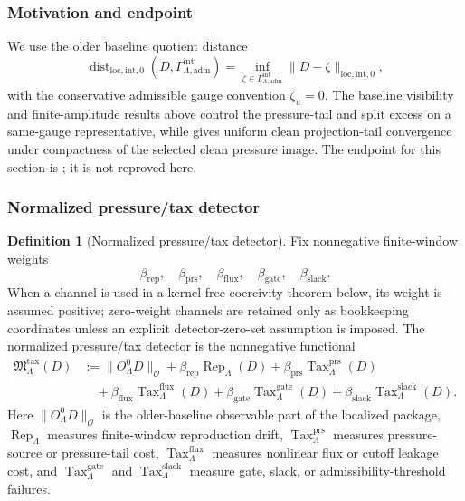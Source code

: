\documentclass[11pt]{article}
\numberwithin{equation}{section}
\theoremstyle{definition}
\newtheorem{definition}[definition]{Definition}
\theoremstyle{remark}
\newcommand{\loc}{\mathrm{loc}}
\newcommand{\intg}{\mathrm{int}}
\newcommand{\adm}{\mathrm{adm}}
\newcommand{\prs}{\mathrm{prs}}
\newcommand{\Dist}{\operatorname{dist}}
\newcommand{\Gammaadm}{\Gamma^{\intg}_{\Lambda,\adm}}
\begin{document}
\subsubsection{Motivation and endpoint}

We use the older baseline quotient distance
\[
    \Dist_{\loc,\intg,0}(D,\Gammaadm)
    =
    \inf_{\zeta\in\Gammaadm}
    \|D-\zeta\|_{\loc,\intg,0},
\]
with the conservative admissible gauge convention \(\zeta_u=0\).  The
baseline visibility and finite-amplitude results above control the
pressure-tail and split excess on a same-gauge representative, while
 gives uniform clean
projection-tail convergence under compactness of the selected clean pressure
image.  The endpoint for this section is
; it is not reproved here.

\subsubsection{Normalized pressure/tax detector}

\begin{definition}[Normalized pressure/tax detector]
\label{def:normalized-pressure-tax-detector}
Fix nonnegative finite-window weights
\[
    \beta_{\mathrm{rep}},\quad
    \beta_{\prs},\quad
    \beta_{\mathrm{flux}},\quad
    \beta_{\mathrm{gate}},\quad
    \beta_{\mathrm{slack}}.
\]
When a channel is used in a kernel-free coercivity theorem below, its weight
is assumed positive; zero-weight channels are retained only as bookkeeping
coordinates unless an explicit detector-zero-set assumption is imposed.
The normalized pressure/tax detector is the nonnegative functional
\[
\begin{aligned}
    \mathfrak M^{\mathrm{tax}}_\Lambda(D)
    &:=
    \|O^0_\Lambda D\|_{\mathcal O}
    +
    \beta_{\mathrm{rep}}\operatorname{Rep}_\Lambda(D)
    +
    \beta_{\prs}\operatorname{Tax}^{\prs}_\Lambda(D)
\\
    &\quad+
    \beta_{\mathrm{flux}}\operatorname{Tax}^{\mathrm{flux}}_\Lambda(D)
    +
    \beta_{\mathrm{gate}}\operatorname{Tax}^{\mathrm{gate}}_\Lambda(D)
    +
    \beta_{\mathrm{slack}}\operatorname{Tax}^{\mathrm{slack}}_\Lambda(D).
\end{aligned}
\]
Here \(\|O^0_\Lambda D\|_{\mathcal O}\) is the older-baseline observable
part of the localized package, \(\operatorname{Rep}_\Lambda\) measures
finite-window reproduction drift, \(\operatorname{Tax}^{\prs}_\Lambda\)
measures pressure-source or pressure-tail cost,
\(\operatorname{Tax}^{\mathrm{flux}}_\Lambda\) measures nonlinear flux or
cutoff leakage cost, and
\(\operatorname{Tax}^{\mathrm{gate}}_\Lambda\) and
\(\operatorname{Tax}^{\mathrm{slack}}_\Lambda\) measure gate, slack, or
admissibility-threshold failures.
\end{definition}
\end{document}
